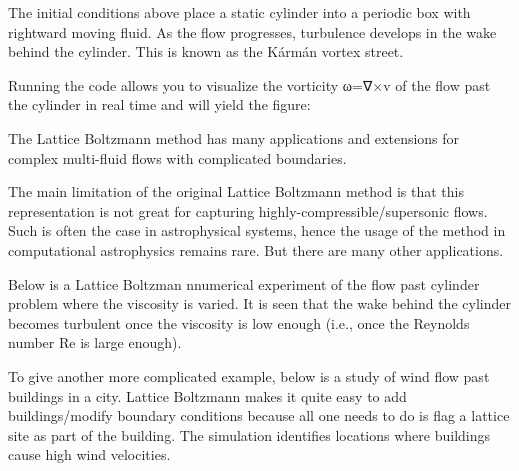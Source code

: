 \documentclass{article}
\begin{document}
The initial conditions above place a static cylinder into a periodic box with rightward moving fluid. As the flow progresses, turbulence develops in the wake behind the cylinder. This is known as the Kármán vortex street.

Running the code allows you to visualize the vorticity ω=∇×v of the flow past the cylinder in real time and will yield the figure:

The Lattice Boltzmann method has many applications and extensions for complex multi-fluid flows with complicated boundaries.

The main limitation of the original Lattice Boltzmann method is that this representation is not great for capturing highly-compressible/supersonic flows. Such is often the case in astrophysical systems, hence the usage of the method in computational astrophysics remains rare. But there are many other applications.

Below is a Lattice Boltzman nnumerical experiment of the flow past cylinder problem where the viscosity is varied. It is seen that the wake behind the cylinder becomes turbulent once the viscosity is low enough (i.e., once the Reynolds number Re is large enough).

To give another more complicated example, below is a study of wind flow past buildings in a city. Lattice Boltzmann makes it quite easy to add buildings/modify boundary conditions because all one needs to do is flag a lattice site as part of the building. The simulation identifies locations where buildings cause high wind velocities.
\end{document}
